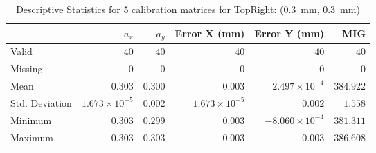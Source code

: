 \begin{table}[h]
    \begin{subtable}{\textwidth}
        \centering
        \footnotesize
        \begin{tabular}{lrrrrr}
            \toprule
                & $a_x$ & $a_y$ & Error X (mm) & Error Y (mm) & MIG  \\
            \midrule
			Valid & $40$ & $40$ & $40$ & $40$ & $40$  \\
			Missing & $0$ & $0$ & $0$ & $0$ & $0$  \\
			Mean & $0.303$ & $0.300$ & $0.003$ & $2.497\times10^{-4}$ & $384.922$  \\
			Std. Deviation & $1.673\times10^{-5}$ & $0.002$ & $1.673\times10^{-5}$ & $0.002$ & $1.558$  \\
			Minimum & $0.303$ & $0.299$ & $0.003$ & $-8.060\times10^{-4}$ & $381.311$  \\
			Maximum & $0.303$ & $0.303$ & $0.003$ & $0.003$ & $386.608$  \\
            \bottomrule
        \end{tabular}
        \caption{$T_{Avg}$}
        \end{subtable}

    \caption{Descriptive Statistics for 5 calibration matrices for \textsf{TopRight:} (\SI{0.3}{\milli\meter}, \SI{0.3}{\milli\meter})}
    \label{table:stats_matrix_topright}
\end{table}

